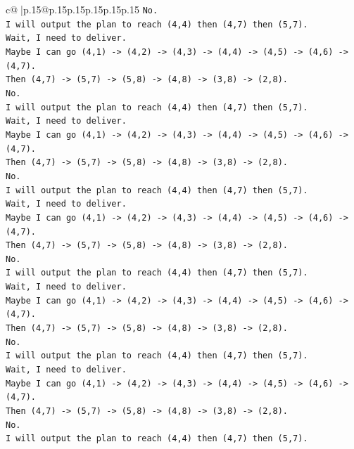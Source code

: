 \documentclass{article}
\begin{document}
{\begin{supertabular}{c@{$\;$}|p{.15\linewidth}@{}p{.15\linewidth}p{.15\linewidth}p{.15\linewidth}p{.15\linewidth}p{.15\linewidth}}
{{{\texttt{No.} \\
\texttt{I will output the plan to reach (4,4) then (4,7) then (5,7).} \\
\texttt{Wait, I need to deliver.} \\
\texttt{Maybe I can go (4,1) {-}> (4,2) {-}> (4,3) {-}> (4,4) {-}> (4,5) {-}> (4,6) {-}> (4,7).} \\
\texttt{Then (4,7) {-}> (5,7) {-}> (5,8) {-}> (4,8) {-}> (3,8) {-}> (2,8).} \\
\texttt{No.} \\
\texttt{I will output the plan to reach (4,4) then (4,7) then (5,7).} \\
\texttt{Wait, I need to deliver.} \\
\texttt{Maybe I can go (4,1) {-}> (4,2) {-}> (4,3) {-}> (4,4) {-}> (4,5) {-}> (4,6) {-}> (4,7).} \\
\texttt{Then (4,7) {-}> (5,7) {-}> (5,8) {-}> (4,8) {-}> (3,8) {-}> (2,8).} \\
\texttt{No.} \\
\texttt{I will output the plan to reach (4,4) then (4,7) then (5,7).} \\
\texttt{Wait, I need to deliver.} \\
\texttt{Maybe I can go (4,1) {-}> (4,2) {-}> (4,3) {-}> (4,4) {-}> (4,5) {-}> (4,6) {-}> (4,7).} \\
\texttt{Then (4,7) {-}> (5,7) {-}> (5,8) {-}> (4,8) {-}> (3,8) {-}> (2,8).} \\
\texttt{No.} \\
\texttt{I will output the plan to reach (4,4) then (4,7) then (5,7).} \\
\texttt{Wait, I need to deliver.} \\
\texttt{Maybe I can go (4,1) {-}> (4,2) {-}> (4,3) {-}> (4,4) {-}> (4,5) {-}> (4,6) {-}> (4,7).} \\
\texttt{Then (4,7) {-}> (5,7) {-}> (5,8) {-}> (4,8) {-}> (3,8) {-}> (2,8).} \\
\texttt{No.} \\
\texttt{I will output the plan to reach (4,4) then (4,7) then (5,7).} \\
\texttt{Wait, I need to deliver.} \\
\texttt{Maybe I can go (4,1) {-}> (4,2) {-}> (4,3) {-}> (4,4) {-}> (4,5) {-}> (4,6) {-}> (4,7).} \\
\texttt{Then (4,7) {-}> (5,7) {-}> (5,8) {-}> (4,8) {-}> (3,8) {-}> (2,8).} \\
\texttt{No.} \\
\texttt{I will output the plan to reach (4,4) then (4,7) then (5,7).} \\
}}}
\end{supertabular}}
\end{document}
